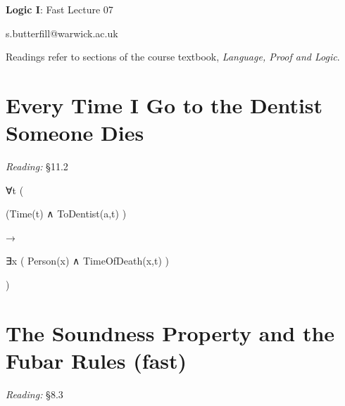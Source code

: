 \documentclass[12pt]{extarticle}
\date{}
\makeatletter
\def \ititle {Origins of Mind}
\def \isubtitle {Lecture 08}
\def \iemail{s.butterfill@warwick.ac.uk}
\makeatother
\begin{document}
\raggedcolumns

\begin{multicols*}{3}

\setlength\footnotesep{1em}







\def \ititle {Logic I}
 
\def \isubtitle {Fast Lecture 07}
 
\begin{center}
 
{\Large
 
\textbf{\ititle}: \isubtitle
 
}
 
 
 
\iemail %
 
\end{center}
 
Readings refer to sections of the course textbook, \emph{Language, Proof and Logic}.
 
 
 
\section{Every Time I Go to the Dentist Someone Dies}
 
\emph{Reading:} §11.2
 
∀t (
 
\hspace{5mm} (Time(t) ∧ ToDentist(a,t) )
 
\hspace{5mm} →
 
\hspace{5mm} ∃x ( Person(x) ∧ TimeOfDeath(x,t) )
 
)
 
 
 
\section{The Soundness Property and the Fubar Rules (fast)}
 
\emph{Reading:} §8.3
 

\end{multicols*}
\end{document}

